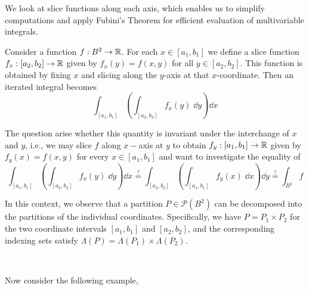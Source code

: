 \documentclass[../Analysis-3.tex]{subfiles}
\begin{document}
We look at slice functions along each axis, which enables us to simplify computations and apply Fubini's Theorem for efficient evaluation of multivariable integrals.

\ssk

Consider a function $ f: B^2 \to \mathbb{R} $. For each $ x \in [a_1, b_1] $ we define a slice function $ f_{x}:[a_2, b_2] \to \mathbb{R} $ given by $ f_{x}(y) = f(x,y) $ for all $ y \in [a_2, b_2] $. This function is obtained by fixing $ x $ and slicing along the $ y $-axis at that $ x $-coordinate. Then an iterated integral becomes
\[  \int_{[a_1, b_1]}\left( \int_{[a_2, b_2]} f_x(y) \; \dd y \right)\dd x  \]

The question arise whether this quantity is invariant under the interchange of $ x $ and $ y $, i.e., we may slice $ f $ along $x-$axis at $ y $ to obtain $ f_y:[a_1, b_1] \to \mathbb{R} $ given by $ f_{y}(x) = f(x,y) $ for every $ x \in [a_1, b_1] $ and want to investigate the equality of
\begin{equation}
  \int_{[a_1, b_1]}\left( \int_{[a_2, b_2]} f_x(y) \; \dd y \right)\dd x \overset{?}{=} \int_{[a_2, b_2]}\left( \int_{[a_1, b_1]} f_y(x) \; \dd x \right)\dd y \overset{?}{=} \int_{B^2} f \label{eq:fubini:cond:check}
\end{equation}

In this context, we observe that a partition $P \in \mathscr{P}(B^2)$ can be decomposed into the partitions of the individual coordinates. Specifically, we have $P = P_1 \times P_2$ for the two coordinate intervals $[a_1, b_1]$ and $[a_2, b_2]$, and the corresponding indexing sets satisfy $\Lambda(P) = \Lambda(P_1) \times \Lambda(P_2)$.

\

Now consider the following example,
\end{document}
